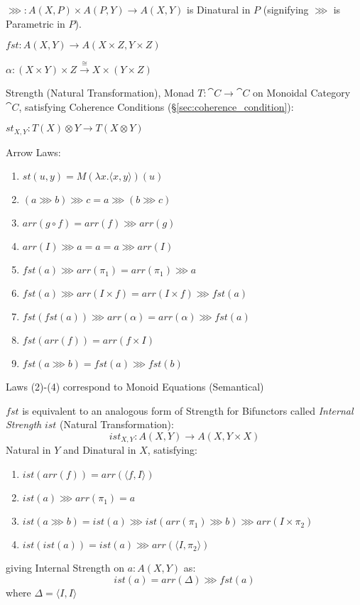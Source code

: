 $\ggg : A(X,P) \times A(P,Y) \rightarrow A(X,Y)$ is Dinatural in $P$
(signifying $\ggg$ is Parametric in $P$). \cite{jacobs-heunen-hasuo09}

$fst : A(X,Y) \rightarrow A(X \times Z, Y \times Z)$

$\alpha : (X \times Y) \times Z
\xrightarrow{\cong} X \times (Y \times Z)$

Strength (Natural Transformation), Monad $T : \cat{C} \rightarrow
\cat{C}$ on Monoidal Category $\cat{C}$, satisfying Coherence
Conditions (\S\ref{sec:coherence_condition}):

$st_{X,Y} : T(X) \otimes Y \rightarrow T(X \otimes Y)$

Arrow Laws:
\begin{enumerate}
  \item $st(u,y) = M(\lambda x.\langle x,y \rangle)(u)$
  \item $(a \ggg b) \ggg c = a \ggg (b \ggg c)$
  \item $arr (g \circ f) = arr(f) \ggg arr(g)$
  \item $arr(I) \ggg a = a = a \ggg arr(I)$
  \item $fst(a) \ggg arr(\pi_1) = arr(\pi_1) \ggg a$
  \item $fst(a) \ggg arr (I \times f) = arr (I \times f) \ggg fst(a)$
  \item $fst (fst(a)) \ggg arr(\alpha) = arr(\alpha) \ggg fst(a)$
  \item $fst (arr(f)) = arr (f \times I)$
  \item $fst (a \ggg b) = fst(a) \ggg fst(b)$
\end{enumerate}
Laws (2)-(4) correspond to Monoid Equations (Semantical)

$fst$ is equivalent to an analogous form of Strength for Bifunctors
called \emph{Internal Strength} $ist$ (Natural Transformation):
\[
  ist_{X,Y} : A(X,Y) \rightarrow A(X,Y \times X)
\]
Natural in $Y$ and Dinatural in $X$, satisfying:
\begin{enumerate}
  \item $ist(arr(f)) = arr(\langle f,I \rangle)$
  \item $ist(a) \ggg arr(\pi_1) = a$
  \item $ist(a \ggg b) = ist(a) \ggg ist(arr(\pi_1) \ggg b) \ggg arr(I
    \times \pi_2)$
  \item $ist(ist(a)) = ist(a) \ggg arr(\langle I, \pi_2 \rangle)$
\end{enumerate}
giving Internal Strength on $a : A(X,Y)$ as:
\[
  ist(a) = arr(\Delta) \ggg fst(a)
\]
where $\Delta = \langle I,I \rangle$

